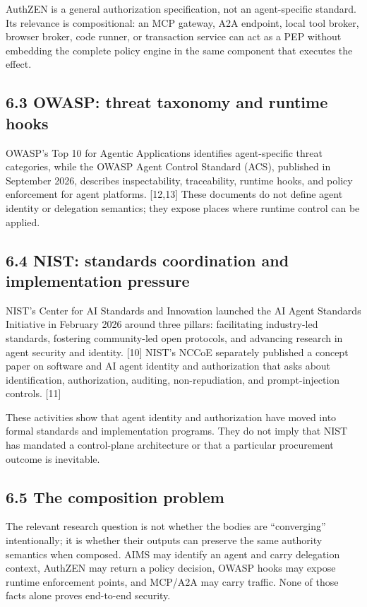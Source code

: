 \documentclass[
  10pt,
  letterpaper,
]{article}
\begin{document}
AuthZEN is a general authorization specification, not an agent-specific
standard. Its relevance is compositional: an MCP gateway, A2A endpoint,
local tool broker, browser broker, code runner, or transaction service
can act as a PEP without embedding the complete policy engine in the
same component that executes the effect.

\subsection{6.3 OWASP: threat taxonomy and runtime
hooks}\label{owasp-threat-taxonomy-and-runtime-hooks}

OWASP's Top 10 for Agentic Applications identifies agent-specific threat
categories, while the OWASP Agent Control Standard (ACS), published in
September 2026, describes inspectability, traceability, runtime hooks,
and policy enforcement for agent platforms. {[}12,13{]} These documents
do not define agent identity or delegation semantics; they expose places
where runtime control can be applied.

\subsection{6.4 NIST: standards coordination and implementation
pressure}\label{nist-standards-coordination-and-implementation-pressure}

NIST's Center for AI Standards and Innovation launched the AI Agent
Standards Initiative in February 2026 around three pillars: facilitating
industry-led standards, fostering community-led open protocols, and
advancing research in agent security and identity. {[}10{]} NIST's NCCoE
separately published a concept paper on software and AI agent identity
and authorization that asks about identification, authorization,
auditing, non-repudiation, and prompt-injection controls. {[}11{]}

These activities show that agent identity and authorization have moved
into formal standards and implementation programs. They do not imply
that NIST has mandated a control-plane architecture or that a particular
procurement outcome is inevitable.

\subsection{6.5 The composition problem}\label{the-composition-problem}

The relevant research question is not whether the bodies are
``converging'' intentionally; it is whether their outputs can preserve
the same authority semantics when composed. AIMS may identify an agent
and carry delegation context, AuthZEN may return a policy decision,
OWASP hooks may expose runtime enforcement points, and MCP/A2A may carry
traffic. None of those facts alone proves end-to-end security.
\end{document}
